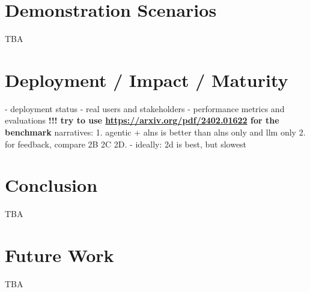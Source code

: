 \documentclass{ecai}
\newtheorem{theorem}{Theorem}
\begin{document}
\section{Demonstration Scenarios}
TBA

\section{Deployment / Impact / Maturity}
- deployment status
- real users and stakeholders
- performance metrics and evaluations
\textbf{!!! try to use \url{https://arxiv.org/pdf/2402.01622} for the benchmark}
narratives:
1. agentic + alns is better than alns only and llm only
2. for feedback, compare 2B 2C 2D.
    - ideally: 2d is best, but slowest


\section{Conclusion}
TBA

\section{Future Work}
TBA





\end{document}
